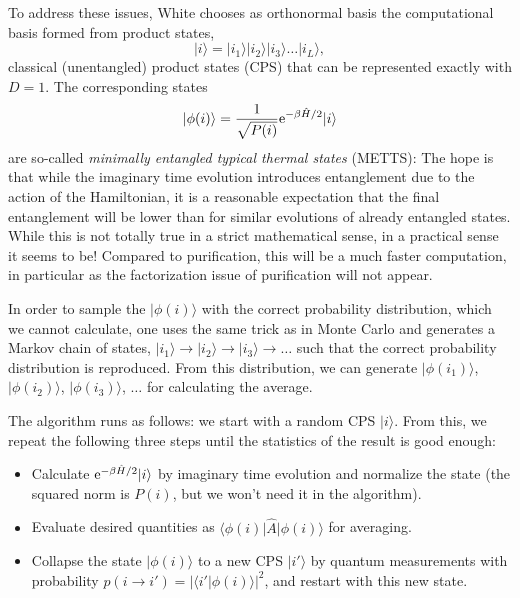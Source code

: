 \documentclass[a4paper,10pt,oneside,onecolumn,1p,times]{elsarticle}
\newcommand{\eul}{{\rm e }}
\newcommand{\bra}[1]{\mbox{$\langle #1  |$}}
\newcommand{\ket}[1]{\mbox{$| #1  \rangle$}}
\newcommand{\braket}[2]{\mbox{$\langle #1  | #2 \rangle$}} 	%
\begin{document}
To address these issues, White chooses as orthonormal basis the computational basis formed from product states,
\begin{equation}
\ket{i} = \ket{i_1}\ket{i_2}\ket{i_3} \ldots \ket{i_L} ,
\end{equation}
classical (unentangled) product states (CPS) that can be represented exactly with $D=1$. The corresponding states
\begin{equation}
\ket{\phi(i)} = \frac{1}{\sqrt{P(i)}} \eul^{-\beta \hat{H}/2} \ket{i}
\end{equation}
are so-called {\em minimally entangled typical thermal states} (METTS): The hope is that while the imaginary time evolution introduces entanglement due to the action of the Hamiltonian, it is a reasonable expectation that the final entanglement will be lower than for similar evolutions of already entangled states. While this is not totally true in a strict mathematical sense, in a practical sense it seems to be! Compared to purification, this will be a much faster computation, in particular as the factorization issue of purification will not appear.

In order to sample the $\ket{\phi(i)}$ with the correct probability distribution, which we cannot calculate, one uses the same trick as in Monte Carlo and generates a Markov chain of states,
$\ket{i_1} \rightarrow \ket{i_2} \rightarrow \ket{i_3} \rightarrow \ldots$ such that the correct probability distribution is reproduced. From this distribution, we can generate $\ket{\phi(i_1)}$, $\ket{\phi(i_2)}$, $\ket{\phi(i_3)}$, $\ldots$ for calculating the average.

The algorithm runs as follows: we start with a random CPS $\ket{i}$. From this, we repeat the following three steps until the statistics of the result is good enough:
\begin{itemize}  
\item Calculate $\eul^{-\beta\hat{H}/2} \ket{i}$ by imaginary time evolution and normalize the state (the squared norm is $P(i)$, but we won't need it in the algorithm). 
\item Evaluate desired quantities as $\bra{\phi(i)} \hat{A} \ket{\phi(i)}$ for averaging.
\item Collapse the state $\ket{\phi(i)}$ to a new CPS $\ket{i'}$ by quantum measurements with probability $p(i\rightarrow i') = |\braket{i'}{\phi(i)}|^2$, and restart with this new state.
\end{itemize}
\end{document}
